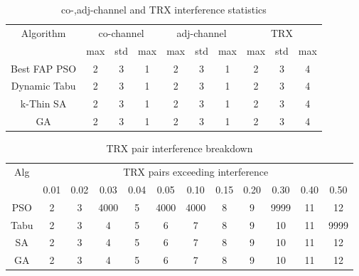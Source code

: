 \begin{table}[H]
\centering
	\begin{tabular}{cccccccccc}
	\toprule
    Algorithm & \multicolumn{3}{c}{co-channel} & \multicolumn{3}{c}{adj-channel} & \multicolumn{3}{c}{TRX}\\
              & max & std & max
              & max & std & max
              & max & std & max\\
    \midrule
    Best FAP PSO & 2 & 3 & 1 & 2 & 3 & 1 & 2 & 3 & 4\\ \hline
    Dynamic Tabu & 2 & 3 & 1 & 2 & 3 & 1 & 2 & 3 & 4\\\hline
    k-Thin SA & 2 & 3 & 1 & 2 & 3 & 1 & 2 & 3 & 4\\\hline
    GA & 2 & 3 & 1 & 2 & 3 & 1 & 2 & 3 & 4\\\hline
    \bottomrule
	\end{tabular}
\caption{co-,adj-channel and TRX interference statistics}
\label{tab:stats-siem2m1}
\end{table}
\begin{table}[H]
\centering
	\begin{tabular}{cccccccccccc}
	\toprule
    Alg & \multicolumn{11}{c}{TRX pairs exceeding interference}\\
    & 0.01 & 0.02 & 0.03 & 0.04 & 0.05 & 0.10 & 0.15 & 0.20 & 0.30 & 0.40 & 0.50 \\
    \midrule
    PSO & 2 & 3 & \tiny{4000} & 5 & \small{4000} & \footnotesize{4000} & 8 & 9 & \scriptsize{9999} & 11 & 12\\
    Tabu & 2 & 3 & 4 & 5 & 6 & 7 & 8 & 9 & 10 & 11 & 9999\\
    SA & 2 & 3 & 4 & 5 & 6 & 7 & 8 & 9 & 10 & 11 & 12\\
    GA & 2 & 3 & 4 & 5 & 6 & 7 & 8 & 9 & 10 & 11 & 12\\
    \bottomrule
	\end{tabular}
\caption{TRX pair interference breakdown}
\label{tab:breakdown-siem2m1}
\end{table}

